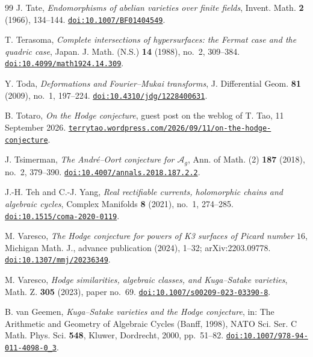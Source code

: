 \begin{thebibliography}{99}
J. Tate,
\emph{Endomorphisms of abelian varieties over finite fields},
Invent. Math. \textbf{2} (1966), 134--144.
\href{https://doi.org/10.1007/BF01404549}{\texttt{doi:10.1007/BF01404549}}.

T. Terasoma,
\emph{Complete intersections of hypersurfaces: the Fermat case and the
quadric case},
Japan. J. Math. (N.S.) \textbf{14} (1988), no.~2, 309--384.
\href{https://doi.org/10.4099/math1924.14.309}{\texttt{doi:10.4099/math1924.14.309}}.

Y. Toda,
\emph{Deformations and Fourier--Mukai transforms},
J. Differential Geom. \textbf{81} (2009), no.~1, 197--224.
\href{https://doi.org/10.4310/jdg/1228400631}{\texttt{doi:10.4310/jdg/1228400631}}.

B. Totaro,
\emph{On the Hodge conjecture},
guest post on the weblog of T. Tao, 11 September 2026.
\href{https://terrytao.wordpress.com/2026/09/11/on-the-hodge-conjecture/}%
{\texttt{terrytao.wordpress.com/2026/09/11/on-the-hodge-conjecture}}.

J. Tsimerman,
\emph{The Andr\'e--Oort conjecture for $\mathcal{A}_{g}$},
Ann. of Math. (2) \textbf{187} (2018), no.~2, 379--390.
\href{https://doi.org/10.4007/annals.2018.187.2.2}{\texttt{doi:10.4007/annals.2018.187.2.2}}.

J.-H. Teh and C.-J. Yang,
\emph{Real rectifiable currents, holomorphic chains and algebraic cycles},
Complex Manifolds \textbf{8} (2021), no.~1, 274--285.
\href{https://doi.org/10.1515/coma-2020-0119}{\texttt{doi:10.1515/coma-2020-0119}}.

M. Varesco,
\emph{The Hodge conjecture for powers of K3 surfaces of Picard number $16$},
Michigan Math. J., advance publication (2024), 1--32; arXiv:2203.09778.
\href{https://doi.org/10.1307/mmj/20236349}{\texttt{doi:10.1307/mmj/20236349}}.

M. Varesco,
\emph{Hodge similarities, algebraic classes, and Kuga--Satake varieties},
Math. Z. \textbf{305} (2023), paper no.~69.
\href{https://doi.org/10.1007/s00209-023-03390-8}{\texttt{doi:10.1007/s00209-023-03390-8}}.

B. van Geemen,
\emph{Kuga--Satake varieties and the Hodge conjecture},
in: The Arithmetic and Geometry of Algebraic Cycles (Banff, 1998),
NATO Sci. Ser. C Math. Phys. Sci. \textbf{548},
Kluwer, Dordrecht, 2000, pp.~51--82.
\href{https://doi.org/10.1007/978-94-011-4098-0_3}{\texttt{doi:10.1007/978-94-011-4098-0\_3}}.


\end{thebibliography}
